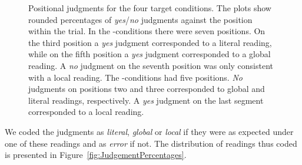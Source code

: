 \documentclass[fleqn,reqno,10pt,draft]{article}
\newcommand{\as}{\acro{as}}
\renewcommand{\es}{\acro{es}}
\begin{document}
\begin{figure}[]
{\begin{tikzpicture}[scale=0.8]
\end{tikzpicture}
\label{fig:ReadingsES-acc}
}


\caption{Positional judgments for the four target conditions. The
  plots show rounded percentages of \emph{yes}/\emph{no} judgments
  against the position within the trial. In the \as-conditions there
  were seven positions. On the third position a \emph{yes} judgment
  corresponded to a literal reading, while on the fifth position a
  \emph{yes} judgment corresponded to a global reading.  A \emph{no}
  judgment on the seventh position was only consistent with a local
  reading. The \es-conditions had five positions. \emph{No} judgments
  on positions two and three corresponded to global and literal
  readings, respectively. A \emph{yes} judgment on the last segment
  corresponded to a local reading.}
\label{fig:JudgmentsK2}
\end{figure}
%
We coded the judgments as {\it literal}, {\it global} or {\it local}
if they were as expected under one of these readings and as {\it
  error} if not. The distribution of readings thus coded is presented
in Figure~\ref{fig:JudgementPercentages}.
%
\end{document}
